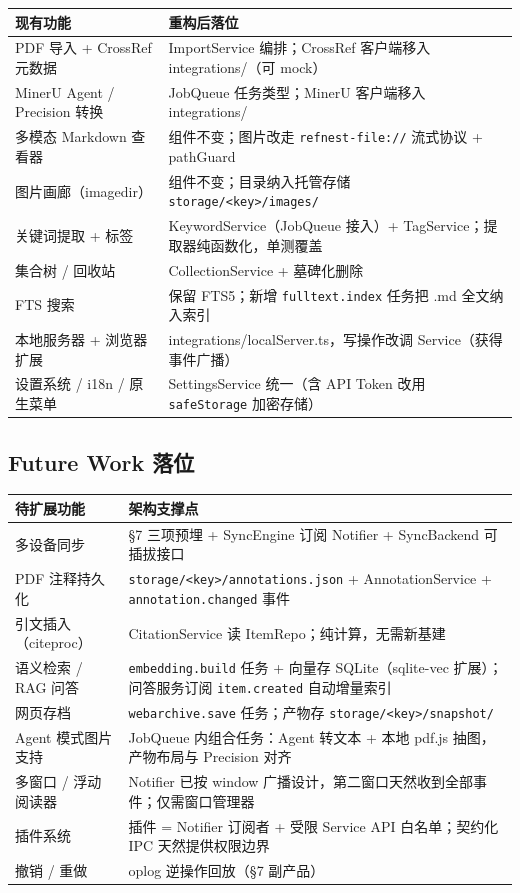 \documentclass[12pt, a4paper]{article}
\begin{document}
\begin{longtable}{p{4.2cm} p{8.2cm}}
  \toprule
  \textbf{现有功能} & \textbf{重构后落位} \\
  \midrule
  PDF 导入 + CrossRef 元数据 & ImportService 编排；CrossRef 客户端移入 integrations/（可 mock） \\
  MinerU Agent / Precision 转换 & JobQueue 任务类型；MinerU 客户端移入 integrations/ \\
  多模态 Markdown 查看器 & 组件不变；图片改走 \texttt{refnest-file://} 流式协议 + pathGuard \\
  图片画廊（imagedir） & 组件不变；目录纳入托管存储 \texttt{storage/<key>/images/} \\
  关键词提取 + 标签 & KeywordService（JobQueue 接入）+ TagService；提取器纯函数化，单测覆盖 \\
  集合树 / 回收站 & CollectionService + 墓碑化删除 \\
  FTS 搜索 & 保留 FTS5；新增 \texttt{fulltext.index} 任务把 .md 全文纳入索引 \\
  本地服务器 + 浏览器扩展 & integrations/localServer.ts，写操作改调 Service（获得事件广播） \\
  设置系统 / i18n / 原生菜单 & SettingsService 统一（含 API Token 改用 \texttt{safeStorage} 加密存储） \\
  \bottomrule
\end{longtable}

\subsection{Future Work 落位}

\begin{longtable}{p{4.2cm} p{8.2cm}}
  \toprule
  \textbf{待扩展功能} & \textbf{架构支撑点} \\
  \midrule
  多设备同步 & \S7 三项预埋 + SyncEngine 订阅 Notifier + SyncBackend 可插拔接口 \\
  PDF 注释持久化 & \texttt{storage/<key>/annotations.json} + AnnotationService + \texttt{annotation.changed} 事件 \\
  引文插入（citeproc） & CitationService 读 ItemRepo；纯计算，无需新基建 \\
  语义检索 / RAG 问答 & \texttt{embedding.build} 任务 + 向量存 SQLite（sqlite-vec 扩展）；问答服务订阅 \texttt{item.created} 自动增量索引 \\
  网页存档 & \texttt{webarchive.save} 任务；产物存 \texttt{storage/<key>/snapshot/} \\
  Agent 模式图片支持 & JobQueue 内组合任务：Agent 转文本 + 本地 pdf.js 抽图，产物布局与 Precision 对齐 \\
  多窗口 / 浮动阅读器 & Notifier 已按 window 广播设计，第二窗口天然收到全部事件；仅需窗口管理器 \\
  插件系统 & 插件 = Notifier 订阅者 + 受限 Service API 白名单；契约化 IPC 天然提供权限边界 \\
  撤销 / 重做 & oplog 逆操作回放（\S7 副产品） \\
  \bottomrule
\end{longtable}
\end{document}
